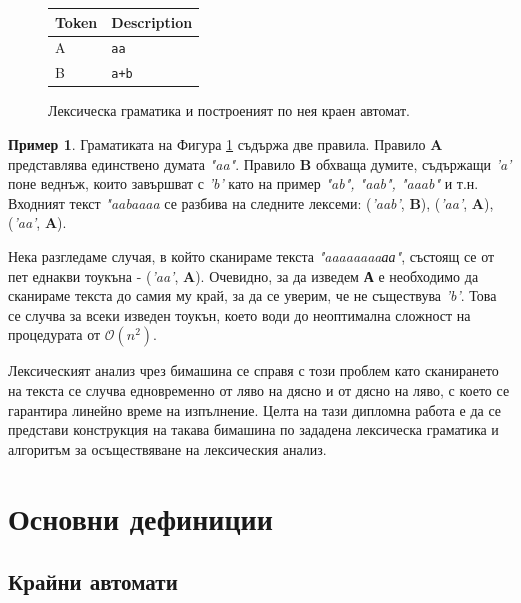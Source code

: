 \documentclass[12pt, oneside]{article}
\theoremstyle{definition}
\newtheorem{example}{Пример}[section]
\begin{document}
\begin{figure}[!htb]
	\begin{center}
		\begin{tabular}{ |l|l| } 
		\hline
		Token & Description \\
		\hline
		A & \verb/аа/ \\
		B & \verb/a+b/ \\
		\hline
		\end{tabular}
	\end{center}
	\centering
	\begingroup
		
	\endgroup
	\label{fig:Lexgr2}
	\caption{Лексическа граматика и построеният по нея краен автомат.}
\end{figure}

\begin{example}
	Граматиката на Фигура \ref{fig:Lexgr2} съдържа две правила. Правило \textbf{A} представлява единствено думата \emph{"aa"}. Правило \textbf{B} обхваща думите, съдържащи \emph{'a'} поне веднъж, които завършват с \emph{'b'} като на пример \emph{"ab", "aab", "aaab"} и т.н. Входният текст \emph{"aabaaaa} се разбива на следните лексеми: (\emph{'aab'}, \textbf{B}), (\emph{'aa'}, \textbf{A}), (\emph{'aa'}, \textbf{A}).

	Нека разгледаме случая, в който сканираме текста \emph{"aaaaaaaaаа"}, състоящ се от пет еднакви тоукъна - (\emph{'aa'}, \textbf{A}). Очевидно, за да изведем \textbf{А} е необходимо да сканираме текста до самия му край, за да се уверим, че не съществува \emph{'b'}. Това се случва за всеки изведен тоукън, което води до неоптимална сложност на процедурата от \( \mathcal{O}(n^2) \).
\end{example}

Лексическият анализ чрез бимашина се справя с този проблем като сканирането на текста се случва едновременно от ляво на дясно и от дясно на ляво, с което се гарантира линейно време на изпълнение. Целта на тази дипломна работа е да се представи конструкция на такава бимашина по зададена лексическа граматика и алгоритъм за осъществяване на лексическия анализ.

\pagebreak

\section{Основни дефиниции}

\subsection{Крайни автомати}
\end{document}
